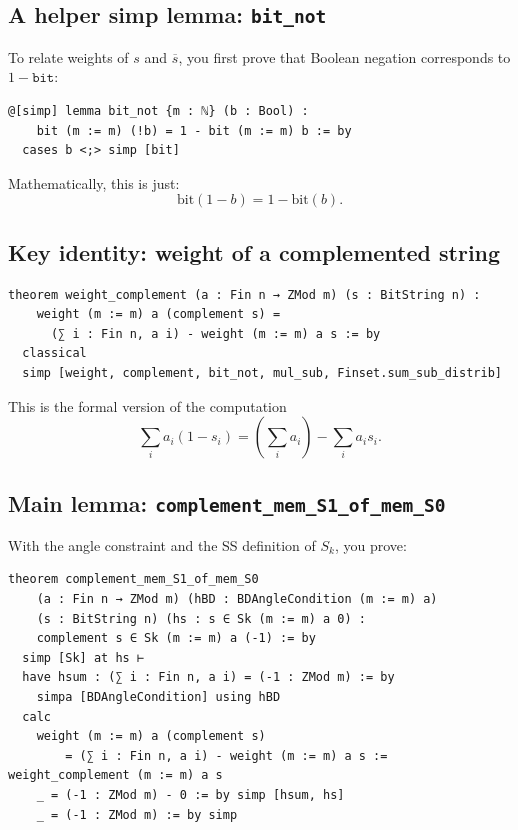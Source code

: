 \documentclass[11pt]{article}
\begin{document}
\subsection*{A helper simp lemma: \texttt{bit\_not}}

To relate weights of $s$ and $\overline{s}$, you first prove that Boolean negation corresponds to $1-\texttt{bit}$:

\begin{lstlisting}
@[simp] lemma bit_not {m : ℕ} (b : Bool) :
    bit (m := m) (!b) = 1 - bit (m := m) b := by
  cases b <;> simp [bit]
\end{lstlisting}

Mathematically, this is just:
\[
\mathrm{bit}(1-b) = 1 - \mathrm{bit}(b).
\]

\subsection*{Key identity: weight of a complemented string}

\begin{lstlisting}
theorem weight_complement (a : Fin n → ZMod m) (s : BitString n) :
    weight (m := m) a (complement s) =
      (∑ i : Fin n, a i) - weight (m := m) a s := by
  classical
  simp [weight, complement, bit_not, mul_sub, Finset.sum_sub_distrib]
\end{lstlisting}

This is the formal version of the computation
\[
\sum_i a_i (1-s_i) = \left(\sum_i a_i\right) - \sum_i a_i s_i.
\]

\subsection*{Main lemma: \texttt{complement\_mem\_S1\_of\_mem\_S0}}

With the angle constraint and the SS definition of $S_k$, you prove:

\begin{lstlisting}
theorem complement_mem_S1_of_mem_S0
    (a : Fin n → ZMod m) (hBD : BDAngleCondition (m := m) a)
    (s : BitString n) (hs : s ∈ Sk (m := m) a 0) :
    complement s ∈ Sk (m := m) a (-1) := by
  simp [Sk] at hs ⊢
  have hsum : (∑ i : Fin n, a i) = (-1 : ZMod m) := by
    simpa [BDAngleCondition] using hBD
  calc
    weight (m := m) a (complement s)
        = (∑ i : Fin n, a i) - weight (m := m) a s := weight_complement (m := m) a s
    _ = (-1 : ZMod m) - 0 := by simp [hsum, hs]
    _ = (-1 : ZMod m) := by simp
\end{lstlisting}
\end{document}
